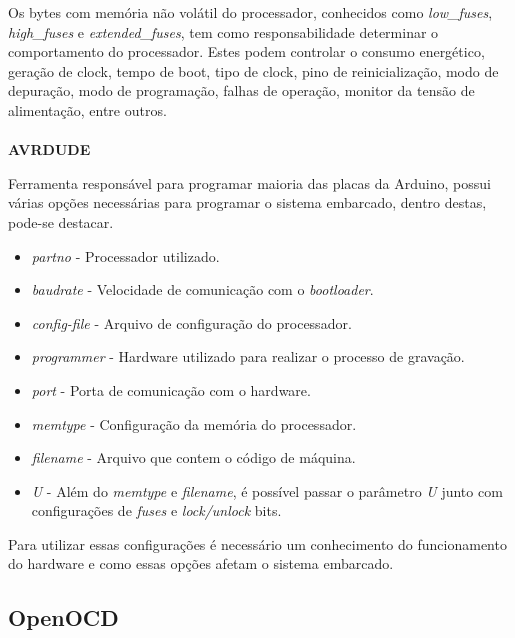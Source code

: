 Os bytes com memória não volátil do processador, conhecidos como \textit{low\_fuses}, \textit{high\_fuses} e \textit{extended\_fuses}, tem como responsabilidade determinar o comportamento do processador. Estes podem controlar o consumo energético, geração de clock, tempo de boot, tipo de clock, pino de reinicialização, modo de depuração, modo de programação, falhas de operação, monitor da tensão de alimentação, entre outros\cite{fuseSettings}\cite{fuses}.
\\
\\
\textbf{AVRDUDE}

Ferramenta responsável para programar maioria das placas da Arduino, possui várias opções necessárias para programar o sistema embarcado, dentro destas, pode-se destacar.

\begin{itemize}
\item \textit{partno} - Processador utilizado.

\item \textit{baudrate} - Velocidade de comunicação com o \textit{bootloader}.

\item \textit{config-file} - Arquivo de configuração do processador.

\item \textit{programmer} - Hardware utilizado para realizar o processo de gravação.

\item \textit{port} - Porta de comunicação com o hardware.

\item \textit{memtype} - Configuração da memória do processador.

\item \textit{filename} - Arquivo que contem o código de máquina.

\item \textit{U} - Além do \textit{memtype} e \textit{filename}, é possível passar o parâmetro \textit{U} junto com configurações de \textit{fuses} e \textit{lock/unlock} bits.
\end{itemize}

Para utilizar essas configurações é necessário um conhecimento do funcionamento do hardware e como essas opções afetam o sistema embarcado. 

\subsection{OpenOCD}

